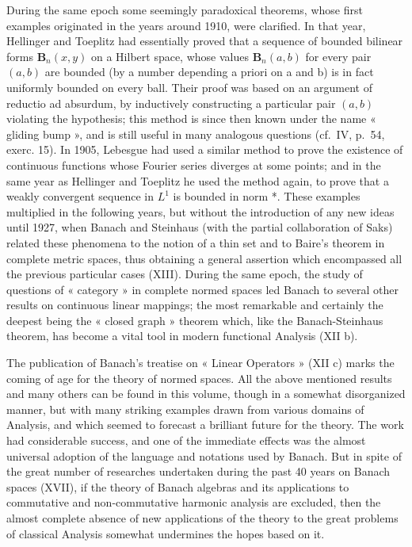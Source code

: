 During the same epoch some seemingly paradoxical theorems, whose first examples originated in the years around 1910, were clarified. In that year, Hellinger and Toeplitz had essentially proved that a sequence of bounded bilinear forms \(\mathbf{B}_{n}(x,y)\) on a Hilbert space, whose values \(\mathbf{B}_{n}(a,b)\) for every pair \((a,b)\) are bounded (by a number depending a priori on a and b) is in fact uniformly bounded on every ball. Their proof was based on an argument of reductio ad absurdum, by inductively constructing a particular pair \((a,b)\) violating the hypothesis; this method is since then known under the name « gliding bump », and is still useful in many analogous questions (cf.~IV, p.~54, exerc. 15). In 1905, Lebesgue had used a similar method to prove the existence of continuous functions whose Fourier series diverges at some points; and in the same year as Hellinger and Toeplitz he used the method again, to prove that a weakly convergent sequence in \(L^{1}\) is bounded in norm *. These examples multiplied in the following years, but without the introduction of any new ideas until 1927, when Banach and Steinhaus (with the partial collaboration of Saks) related these phenomena to the notion of a thin set and to Baire's theorem in complete metric spaces, thus obtaining a general assertion which encompassed all the previous particular cases (XIII). During the same epoch, the study of questions of « category » in complete normed spaces led Banach to several other results on continuous linear mappings; the most remarkable and certainly the deepest being the « closed graph » theorem which, like the Banach-Steinhaus theorem, has become a vital tool in modern functional Analysis (XII b).

The publication of Banach's treatise on « Linear Operators » (XII c) marks the coming of age for the theory of normed spaces. All the above mentioned results and many others can be found in this volume, though in a somewhat disorganized manner, but with many striking examples drawn from various domains of Analysis, and which seemed to forecast a brilliant future for the theory. The work had considerable success, and one of the immediate effects was the almost universal adoption of the language and notations used by Banach. But in spite of the great number of researches undertaken during the past 40 years on Banach spaces (XVII), if the theory of Banach algebras and its applications to commutative and non-commutative harmonic analysis are excluded, then the almost complete absence of new applications of the theory to the great problems of classical Analysis somewhat undermines the hopes based on it.

